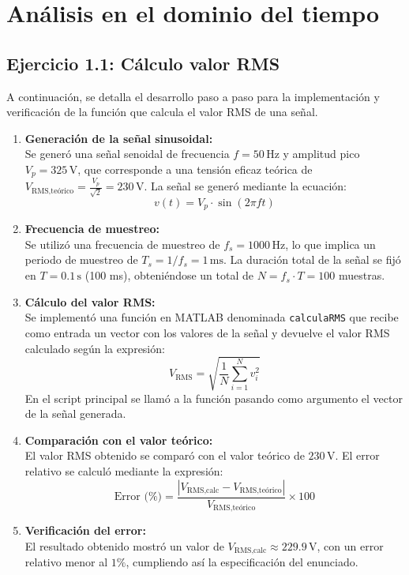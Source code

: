 \documentclass{article}
\begin{document}
\newpage


\renewcommand{\contentsname}{Índice}
\tableofcontents
\newpage
\section{Análisis en el dominio del tiempo}
\subsection{Ejercicio 1.1: Cálculo valor RMS}
A continuación, se detalla el desarrollo paso a paso para la implementación y verificación de la función que calcula el valor RMS de una señal.

\begin{enumerate}
    \item \textbf{Generación de la señal sinusoidal:} \\
    Se generó una señal senoidal de frecuencia $f = 50\,\text{Hz}$ y amplitud pico $V_p = 325\,\text{V}$, que corresponde a una tensión eficaz teórica de $V_{\text{RMS,teórico}} = \frac{V_p}{\sqrt{2}} = 230\,\text{V}$. 
    La señal se generó mediante la ecuación:
    \[
        v(t) = V_p \cdot \sin(2\pi f t)
    \]

    \item \textbf{Frecuencia de muestreo:} \\
    Se utilizó una frecuencia de muestreo de $f_s = 1000\,\text{Hz}$, lo que implica un periodo de muestreo de $T_s = 1/f_s = 1\,\text{ms}$. 
    La duración total de la señal se fijó en $T = 0.1\,\text{s}$ (100 ms), obteniéndose un total de $N = f_s \cdot T = 100$ muestras.

    \item \textbf{Cálculo del valor RMS:} \\
    Se implementó una función en MATLAB denominada \texttt{calculaRMS} que recibe como entrada un vector con los valores de la señal y devuelve el valor RMS calculado según la expresión:
    \[
        V_{\text{RMS}} = \sqrt{\frac{1}{N} \sum_{i=1}^{N} v_i^2}
    \]
    En el script principal se llamó a la función pasando como argumento el vector de la señal generada.

    \item \textbf{Comparación con el valor teórico:} \\
    El valor RMS obtenido se comparó con el valor teórico de $230\,\text{V}$. 
    El error relativo se calculó mediante la expresión:
    \[
        \text{Error (\%)} = \frac{|V_{\text{RMS,calc}} - V_{\text{RMS,teórico}}|}{V_{\text{RMS,teórico}}} \times 100
    \]

    \item \textbf{Verificación del error:} \\
    El resultado obtenido mostró un valor de $V_{\text{RMS,calc}} \approx 229.9\,\text{V}$, con un error relativo menor al $1\%$, cumpliendo así la especificación del enunciado.
\end{enumerate}
\end{document}
